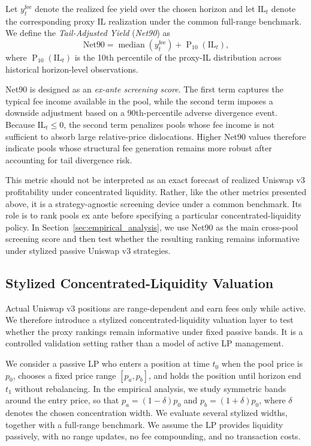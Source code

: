 \documentclass[10pt,conference,compsocconf]{IEEEtran}
\begin{document}
Let $y^{\text{fee}}_t$ denote the realized fee yield over the chosen horizon and let $\mathrm{IL}_t$ denote the corresponding proxy IL realization under the common full-range benchmark. We define the \emph{Tail-Adjusted Yield} (\emph{Net90}) as
\begin{equation}
\label{eq:net90}
\mathrm{Net90}
=
\operatorname{median}\!\left(y^{\text{fee}}_{t}\right)
+
\operatorname{P}_{10}\!\left(\mathrm{IL}_{t}\right),
\end{equation}
where $\operatorname{P}_{10}(\mathrm{IL}_t)$ is the 10th percentile of the proxy-IL distribution across historical horizon-level observations.

Net90 is designed as an \emph{ex-ante screening score}. The first term captures the typical fee income available in the pool, while the second term imposes a downside adjustment based on a 90th-percentile adverse divergence event. Because $\mathrm{IL}_t \le 0$, the second term penalizes pools whose fee income is not sufficient to absorb large relative-price dislocations. Higher Net90 values therefore indicate pools whose structural fee generation remains more robust after accounting for tail divergence risk.

This metric should not be interpreted as an exact forecast of realized Uniswap v3 profitability under concentrated liquidity. Rather, like the other metrics presented above, it is a strategy-agnostic screening device under a common benchmark. Its role is to rank pools ex ante before specifying a particular concentrated-liquidity policy. In Section~\ref{sec:empirical_analysis}, we use Net90 as the main cross-pool screening score and then test whether the resulting ranking remains informative under stylized passive Uniswap v3 strategies.


\subsection{{Stylized Concentrated-Liquidity Valuation}}
\label{subsec:cl_valuation}

Actual Uniswap v3 positions are range-dependent and earn fees only while active. We therefore introduce a stylized concentrated-liquidity valuation layer to test whether the proxy rankings remain informative under fixed passive bands. It is a controlled validation setting rather than a model of active LP management.

{We consider a passive LP who enters a position at time $t_0$ when the pool price is $p_0$, chooses a fixed price range $[p_a,p_b]$, and holds the position until horizon end $t_1$ without rebalancing. In the empirical analysis, we study symmetric bands around the entry price, so that $p_a=(1-\delta)p_0$ and $p_b=(1+\delta)p_0$, where $\delta$ denotes the chosen concentration width. We evaluate several stylized widths, together with a full-range benchmark. We assume the LP provides liquidity passively, with no range updates, no fee compounding, and no transaction costs.}
\end{document}
